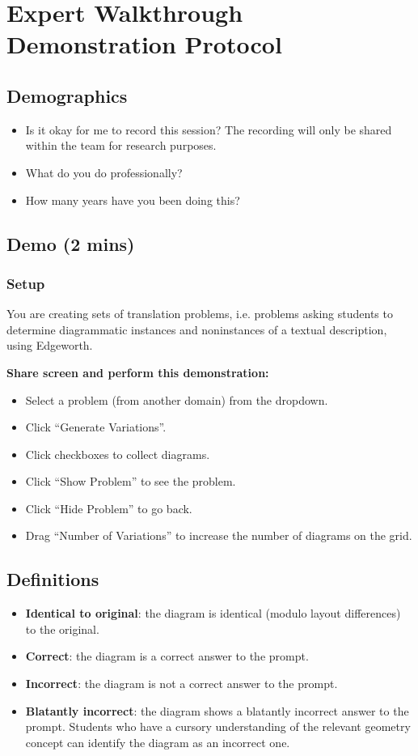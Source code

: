 \chapter{\Edgeworth{} Expert Walkthrough Demonstration Protocol}
\label{app:expert-walkthrough}

\section*{Demographics}
\begin{itemize}
    \item Is it okay for me to record this session? The recording will only be shared within the team for research purposes.
    \item What do you do professionally?
    \item How many years have you been doing this?
\end{itemize}

\section*{Demo (2 mins)}
\subsection*{Setup}
You are creating sets of translation problems, i.e. problems asking students to determine diagrammatic instances and noninstances of a textual description, using Edgeworth.

\textbf{Share screen and perform this demonstration:}
\begin{itemize}
    \item Select a problem (from another domain) from the dropdown.
    \item Click ``Generate Variations''.
    \item Click checkboxes to collect diagrams.
    \item Click ``Show Problem'' to see the problem.
    \item Click ``Hide Problem'' to go back.
    \item Drag ``Number of Variations'' to increase the number of diagrams on the grid.
\end{itemize}

\section*{Definitions}
\begin{itemize}
    \item \textbf{Identical to original}: the diagram is identical (modulo layout differences) to the original.
    \item \textbf{Correct}: the diagram is a correct answer to the prompt.
    \item \textbf{Incorrect}: the diagram is not a correct answer to the prompt.
    \item \textbf{Blatantly incorrect}: the diagram shows a blatantly incorrect answer to the prompt. Students who have a cursory understanding of the relevant geometry concept can identify the diagram as an incorrect one.
\end{itemize}

